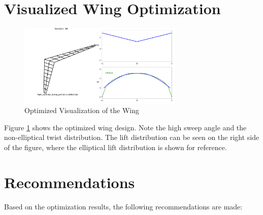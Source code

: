 \documentclass{article}
\begin{document}
\section{Visualized Wing Optimization}
\begin{figure}[h!]
    \centering
    \includegraphics[width=0.7\textwidth]{./Optimized_Wing.pdf}
    \caption{Optimized Visualization of the Wing}
    \label{fig:optimized_wing}
\end{figure}

Figure \ref{fig:optimized_wing} shows the optimized wing design. Note the high sweep angle and the non-elliptical twist distribution. The lift distribution can be seen on the right side of the figure, where the elliptical lift distribution is shown for reference.

\section{Recommendations}
Based on the optimization results, the following recommendations are made:
\end{document}
